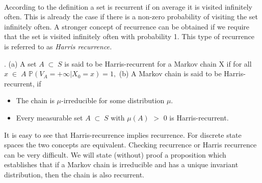 \documentclass[a4paper,10pt]{article}
\newenvironment{definition}[1][Definition]{\begin{trivlist}
\item[\hskip \labelsep {\bfseries #1}]}{\end{trivlist}}
\begin{document}
\paragraph{}
   According to the definition a set is recurrent if on average it is visited infinitely often. This is already
   the case if there is a non-zero probability of visiting the set infinitely often. A stronger concept of recurrence
   can be obtained if we require that the set is visited infinitely often with probability 1. This
   type of recurrence is referred to as \textit{Harris recurrence.}
   \begin{definition}[Harris Recurrence]. (a) A set $A \;\subset\; S$ is said to be Harris-recurrent for a Markov
   chain X if for all $x\;\in \; A$
   $\mathbb{P} \left(V_{A} = +\infty | X_0 = x \right) = 1,$    
(b) A Markov chain is said to be Harris-recurrent, if 
\begin{itemize}
 \item The chain is $\mu$-irreducible for some distribution $\mu$.
 \item Every measurable set $A \; \subset \; S$ with $\mu(A)$ $>$ 0
 is Harris-recurrent.\end{itemize}

    
   \end{definition}
It is easy to see that Harris-recurrence implies recurrence. For discrete state spaces the two concepts are 
equivalent.
    Checking recurrence or Harris recurrence can be very difficult. We will state (without) proof a proposition 
  which establishes that if a Markov chain is irreducible and has a unique invariant distribution, then the chain is 
  also recurrent. 
\end{document}
